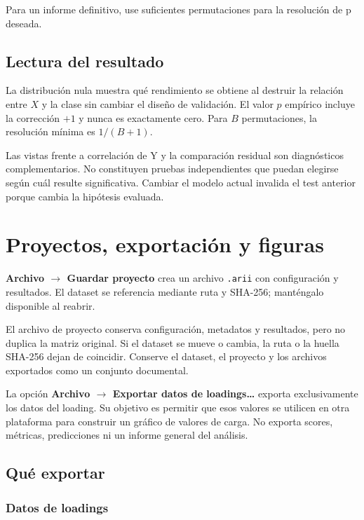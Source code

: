 \documentclass[11pt,a4paper,openany]{report}
\newcommand{\menu}[1]{\textbf{#1}}
\newcommand{\code}[1]{\texttt{#1}}
\begin{document}
Para un informe definitivo, use suficientes permutaciones para la resolución de
p deseada.

\section{Lectura del resultado}

La distribución nula muestra qué rendimiento se obtiene al destruir la relación
entre $X$ y la clase sin cambiar el diseño de validación. El valor $p$ empírico
incluye la corrección $+1$ y nunca es exactamente cero. Para $B$ permutaciones,
la resolución mínima es $1/(B+1)$.

Las vistas frente a correlación de Y y la comparación residual son diagnósticos
complementarios. No constituyen pruebas independientes que puedan elegirse
según cuál resulte significativa. Cambiar el modelo actual invalida el test
anterior porque cambia la hipótesis evaluada.

\chapter{Proyectos, exportación y figuras}

\menu{Archivo \texorpdfstring{$\rightarrow$}{ > } Guardar proyecto} crea un
archivo \code{.arii} con configuración y resultados. El dataset se referencia mediante ruta y SHA-256; manténgalo disponible al reabrir.

El archivo de proyecto conserva configuración, metadatos y resultados, pero no
duplica la matriz original. Si el dataset se mueve o cambia, la ruta o la huella
SHA-256 dejan de coincidir. Conserve el dataset, el proyecto y los archivos
exportados como un conjunto documental.

La opción \menu{Archivo \texorpdfstring{$\rightarrow$}{ > } Exportar datos de
loadings…} exporta exclusivamente los datos del loading. Su objetivo es permitir
que esos valores se utilicen en otra plataforma para construir un gráfico de
valores de carga. No exporta scores, métricas, predicciones ni un informe general
del análisis.

\section{Qué exportar}

\subsection{Datos de loadings}
\end{document}
